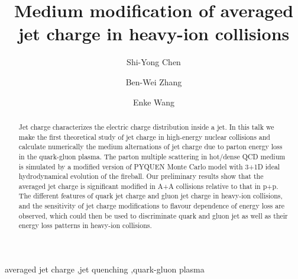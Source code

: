 \documentclass[3p,times,twocolumn]{elsarticle}
\begin{document}
\begin{frontmatter}



\dochead{}

\title{Medium modification of averaged jet charge in heavy-ion collisions}


\author[label1]{Shi-Yong Chen}
\author[label1]{Ben-Wei Zhang}
\author[label1]{Enke Wang}
\address[label1]{Key Laboratory of Quark \& Lepton Physics (MOE) and Institute of Particle Physics,
 Central China Normal University, Wuhan 430079, China}



\begin{abstract}

Jet charge characterizes the electric charge distribution inside a jet. In this talk we make the first theoretical study of jet charge in high-energy nuclear collisions and calculate numerically the medium alternations of jet charge due to parton energy loss in the quark-gluon plasma. The parton multiple scattering in hot/dense QCD medium is simulated by a modified version of  PYQUEN Monte Carlo model with 3+1D ideal hydrodynamical evolution of the fireball. Our preliminary results show that the averaged jet charge is significant modified in A+A collisions relative to that in p+p. The different features of quark jet charge and gluon jet charge in heavy-ion collisions, and the sensitivity of jet charge modifications to flavour dependence of energy loss are observed, which could then be used  to discriminate quark and gluon jet as well as their energy loss patterns in heavy-ion collisions.
\end{abstract}

\begin{keyword}
averaged jet charge \sep jet quenching \sep quark-gluon plasma

\end{keyword}

\end{frontmatter}
\end{document}

